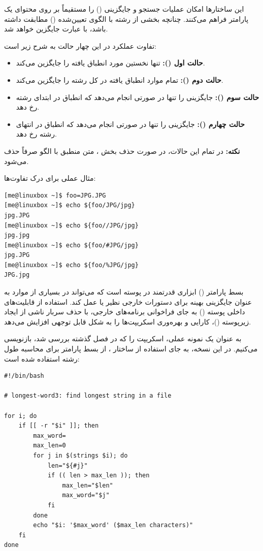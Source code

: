 این ساختارها امکان عملیات جستجو و جایگزینی () را مستقیماً بر روی محتوای یک پارامتر فراهم می‌کنند. چنانچه بخشی از رشته با الگوی تعیین‌شده () مطابقت داشته باشد، با عبارت  جایگزین خواهد شد.

تفاوت عملکرد در این چهار حالت به شرح زیر است:

\begin{itemize}
  \item \textbf{حالت اول (\cmd{/}):} تنها نخستین مورد انطباق یافته را جایگزین می‌کند.
  \item \textbf{حالت دوم (\cmd{//}):} تمام موارد انطباق یافته در کل رشته را جایگزین می‌کند.
  \item \textbf{حالت سوم (\cmd{/\#}):} جایگزینی را تنها در صورتی انجام می‌دهد که انطباق در ابتدای رشته رخ دهد.
  \item \textbf{حالت چهارم (\cmd{/\%}):} جایگزینی را تنها در صورتی انجام می‌دهد که انطباق در انتهای رشته رخ دهد.
\end{itemize}

\begin{note}
\textbf{نکته:} در تمام این حالات، در صورت حذف بخش ، متن منطبق با الگو صرفاً حذف می‌شود.
\end{note}

مثال عملی برای درک تفاوت‌ها:

\begin{latin}
\begin{lstlisting}
[me@linuxbox ~]$ foo=JPG.JPG
[me@linuxbox ~]$ echo ${foo/JPG/jpg}
jpg.JPG
[me@linuxbox ~]$ echo ${foo//JPG/jpg}
jpg.jpg
[me@linuxbox ~]$ echo ${foo/#JPG/jpg}
jpg.JPG
[me@linuxbox ~]$ echo ${foo/%JPG/jpg}
JPG.jpg
\end{lstlisting}
\end{latin}

بسط پارامتر () ابزاری قدرتمند در پوسته است که می‌تواند در بسیاری از موارد به عنوان جایگزینی بهینه برای دستورات خارجی نظیر  یا  عمل کند. استفاده از قابلیت‌های داخلی پوسته () به جای فراخوانی برنامه‌های خارجی، با حذف سربار ناشی از ایجاد زیرپوسته ()، کارایی و بهره‌وری اسکریپت‌ها را به شکل قابل توجهی افزایش می‌دهد.

به عنوان یک نمونه عملی، اسکریپت  را که در فصل گذشته بررسی شد، بازنویسی می‌کنیم. در این نسخه، به جای استفاده از ساختار ، از بسط پارامتر  برای محاسبه طول رشته استفاده شده است:

\begin{latin}
\begin{lstlisting}
#!/bin/bash

# longest-word3: find longest string in a file

for i; do
    if [[ -r "$i" ]]; then
        max_word=
        max_len=0
        for j in $(strings $i); do
            len="${#j}"
            if (( len > max_len )); then
                max_len="$len"
                max_word="$j"
            fi
        done
        echo "$i: '$max_word' ($max_len characters)"
    fi
done
\end{lstlisting}
\end{latin}

